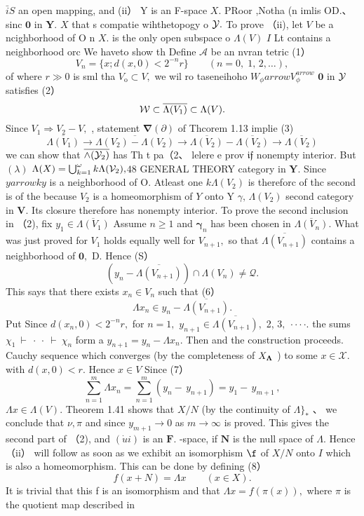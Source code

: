 $\bar{i}S$ an open mapping, and (ii） Y is an F-space $\textstyle X.$ PRoor ,Notha (n imlis OD.、sinc $\mathbf{0}$ in ${\boldsymbol{Y}}.$ $\textstyle X$ that s compatie wihthetopogy o ${\cal{Y}}.$ To prove （ii), let ${\mathbf{}}V$ be a ncighborhood of O n $X.$ is the only open subspace o $\Lambda(V)$ $\boldsymbol{\mathit{I}}$ Lt contains a neighborhood orc We haveto show th Define $\mathcal{A}$ be an nvran tetric (1） $$ V_{n}=\{x;d(x,0)<2^{-n}r\}\qquad(n=0,\;1,\,2,\dots), $$ of where $\scriptstyle r\gg0$ is sml tha $V_{\mathrm{o}}\subset V,$ we wil ro taseneihoho $W_{\phi} arrow V_{\phi}^{ arrow}$ $\mathbf{0}$ in ${\cal{Y}}$ satisfies (2） $$ {\cal W}\subset\overline{{{\Lambda(V_{1})}}}\subset\Lambda(V). $$ Since $V_{1}\Rightarrow V_{2}-V,$ , statement $\mathbf{\nabla}(\partial)$ of Thcorem 1.13 implie (3) $$ \overline{{{\Lambda(V_{1})}}}\to\overline{{{\Lambda(V_{2})-\Lambda(V_{2})}}}\to\overline{{{\Lambda(V_{2})}}}-\overline{{{\Lambda(V_{2})}}}\to\overline{{{\Lambda(V_{2})}}} $$ we can show that $\overline{{\land({\cal{Y}}_{2})}}$ has Th t pa（2、 lelere e prov ${\mathfrak{i f}}$ nonempty interior. But $(\lambda)$ $\Lambda(X)=\bigcup_{k=1}^{\omega}k\Lambda({\cal V}_{2}),$$48$ GENERAL THEORY category in ${\boldsymbol{Y}}.$ Since $y arrow k y$ is a neighborhood of O. Atleast one $k\Lambda(V_{2})$ is thereforc of thc second is of the because ${\mathit{V}}_{2}$ is a homeomorphism of ${\mathbf{}}Y$ onto Y $\gamma,\,\Lambda(V_{2})$ second category in ${\boldsymbol{V}}.$ Its closure therefore has nonempty interior. To prove the second inclusion in （2), fix $y_{1}\in{\overline{{\Lambda(V_{1})}}}$ Assume $\scriptstyle n\geq1$ and ${\boldsymbol{\gamma}}_{n}$ has been chosen in ${\overline{{\Lambda(V_{n})}}}.$ What was just proved for $V_{1}$ holds equally well for $V_{n+1},$ so that $\overline{{\Lambda(V_{n+1})}}$ contains a neighborhood of ${\boldsymbol{0}},$ D. Hence (S） $$ \left(y_{n}-{\overline{{\Lambda(V_{n+1})}}}\right)\cap\Lambda(V_{n})\not=\mathcal{Q}. $$ This says that there exists $x_{n}\in V_{n}$ such that (6） $$ \Lambda x_{n}\in y_{n}-\overline{{{\Lambda(V_{n+1})}}}. $$ Put Since $d(x_{n},0)<2^{-n}r,$ for $n=1,$ $y_{n+1}\in{\overline{{\Lambda(V_{n+1})}}},$ 2, $3,\ \cdot\cdot\cdot\cdot.$ the sums $\chi_{1}\ \vdash\ \cdot\ \cdot\ \vdash\ \chi_{n}$ form a $y_{n+1}=y_{n}-\Lambda x_{n}.$ Then and the construction proceeds. Cauchy sequence which converges (by the completeness of $X_{\mathrm{\bf{\Lambda}}}$ ) to some $x\in{\mathcal{X}}.$ with $d(x,0)<r.$ Hence $x\in V$ Since (7） $$ \sum_{n=1}^{m}\Lambda x_{n}=\sum_{n=1}^{m}(y_{n}-\,y_{n+1})=y_{1}-\,y_{m+1}\,, $$ $\Lambda x\in\Lambda(V).$ Theorem 1.41 shows that $X/N$ (by the continuity of $\Lambda\}_{*}$ 、 we conclude that $\nu,\pi$ and since $y_{m+1}\to0$ as $m\to\infty$ is proved. This gives the second part of （2), and $({\dot{u}}i)$ is an ${\boldsymbol{F}}.$ -space, if ${\boldsymbol{N}}$ is the null space of $\Lambda.$ Hence（ii） will follow as soon as we exhibit an isomorphism $\boldsymbol{\f}$ of $X/N$ onto $\boldsymbol{\mathit{I}}$ which is also a homeomorphism. This can be done by defining (8） $$ f(x+N)=\Lambda x\qquad(x\in X). $$ It is trivial that this f is an isomorphism and that $\Lambda x=f(\pi(x)),$ where $\textstyle\pi$ is the quotient map described in 